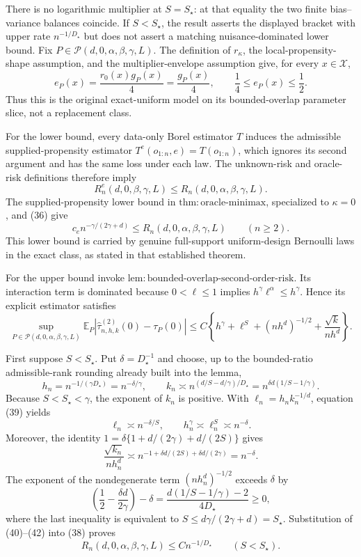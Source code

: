 There is no logarithmic multiplier at \(S=S_\star\): at that equality the two finite bias--variance balances coincide.  If \(S<S_\star\), the result asserts the displayed bracket with upper rate \(n^{-1/D_\star}\) but does not assert a matching nuisance-dominated lower bound.
Fix \(P\in\mathcal P(d,0,\alpha,\beta,\gamma,L)\).  The definition of \(r_\kappa\), the local-propensity-shape assumption, and the multiplier-envelope assumption give, for every \(x\in\mathcal X\),
\[
 e_P(x)=\frac{r_0(x)g_P(x)}4=\frac{g_P(x)}4,
 \qquad
 \frac14\leq e_P(x)\leq\frac12.
 \tag{35}
\]
Thus this is the original exact-uniform model on its bounded-overlap parameter slice, not a replacement class.

For the lower bound, every data-only Borel estimator \(T\) induces the admissible supplied-propensity estimator \(T^e(o_{1:n},e)=T(o_{1:n})\), which ignores its second argument and has the same loss under each law.  The unknown-risk and oracle-risk definitions therefore imply
\[
 R_n^e(d,0,\beta,\gamma,L)
 \leq R_n(d,0,\alpha,\beta,\gamma,L).
 \tag{36}
\]
The supplied-propensity lower bound in \(\mathrm{thm:oracle\mbox{-}minimax}\), specialized to \(\kappa=0\), and (36) give
\[
 c_e n^{-\gamma/(2\gamma+d)}
 \leq R_n(d,0,\alpha,\beta,\gamma,L)
 \qquad(n\geq2).
 \tag{37}
\]
This lower bound is carried by genuine full-support uniform-design Bernoulli laws in the exact class, as stated in that established theorem.

For the upper bound invoke \(\mathrm{lem:bounded\mbox{-}overlap\mbox{-}second\mbox{-}order\mbox{-}risk}\).  Its interaction term is dominated because \(0<\ell\leq1\) implies \(h^\gamma\ell^\alpha\leq h^\gamma\).  Hence its explicit estimator satisfies
\[
 \sup_{P\in\mathcal P(d,0,\alpha,\beta,\gamma,L)}
 \mathbb E_P|\widehat\tau^{(2)}_{n,h,k}(0)-\tau_P(0)|
 \leq C\left\{h^\gamma+\ell^S+(nh^d)^{-1/2}
 +\frac{\sqrt{k}}{nh^d}\right\}.
 \tag{38}
\]

First suppose \(S<S_\star\).  Put \(\delta=D_\star^{-1}\) and choose, up to the bounded-ratio admissible-rank rounding already built into the lemma,
\[
 h_n=n^{-1/(\gamma D_\star)}=n^{-\delta/\gamma},
 \qquad
 k_n\asymp n^{(d/S-d/\gamma)/D_\star}
 =n^{\delta d(1/S-1/\gamma)}.
 \tag{39}
\]
Because \(S<S_\star<\gamma\), the exponent of \(k_n\) is positive.  With \(\ell_n=h_nk_n^{-1/d}\), equation (39) yields
\[
 \ell_n\asymp n^{-\delta/S},
 \qquad
 h_n^\gamma\asymp\ell_n^S\asymp n^{-\delta}.
 \tag{40}
\]
Moreover, the identity \(1=\delta\{1+d/(2\gamma)+d/(2S)\}\) gives
\[
 \frac{\sqrt{k_n}}{nh_n^d}
 \asymp n^{-1+\delta d/(2S)+\delta d/(2\gamma)}
 =n^{-\delta}.
 \tag{41}
\]
The exponent of the nondegenerate term \((nh_n^d)^{-1/2}\) exceeds \(\delta\) by
\[
 \left(\frac12-\frac{\delta d}{2\gamma}\right)-\delta
 =\frac{d(1/S-1/\gamma)-2}{4D_\star}\geq0,
 \tag{42}
\]
where the last inequality is equivalent to \(S\leq d\gamma/(2\gamma+d)=S_\star\).  Substitution of (40)--(42) into (38) proves
\[
 R_n(d,0,\alpha,\beta,\gamma,L)\leq Cn^{-1/D_\star}
 \qquad(S<S_\star).
 \tag{43}
\]

